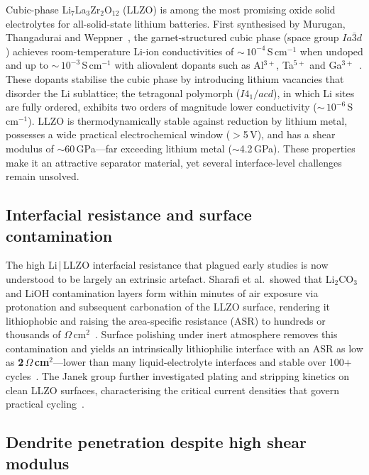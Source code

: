 \documentclass[12pt,a4paper,oneside]{book}
\begin{document}
Cubic-phase Li$_7$La$_3$Zr$_2$O$_{12}$ (LLZO) is among the most promising oxide solid electrolytes for all-solid-state lithium batteries. First synthesised by Murugan, Thangadurai and Weppner~\cite{Murugan2007}, the garnet-structured cubic phase (space group $Ia\bar{3}d$) achieves room-temperature Li-ion conductivities of $\sim$\,$10^{-4}$\,S\,cm$^{-1}$ when undoped and up to $\sim$\,$10^{-3}$\,S\,cm$^{-1}$ with aliovalent dopants such as Al$^{3+}$, Ta$^{5+}$ and Ga$^{3+}$~\cite{Thangadurai2014}. These dopants stabilise the cubic phase by introducing lithium vacancies that disorder the Li sublattice; the tetragonal polymorph ($I4_1/acd$), in which Li sites are fully ordered, exhibits two orders of magnitude lower conductivity ($\sim$\,$10^{-6}$\,S\,cm$^{-1}$). LLZO is thermodynamically stable against reduction by lithium metal, possesses a wide practical electrochemical window ($>$5\,V), and has a shear modulus of $\sim$60\,GPa---far exceeding lithium metal ($\sim$4.2\,GPa). These properties make it an attractive separator material, yet several interface-level challenges remain unsolved.

\subsection{Interfacial resistance and surface contamination}

The high Li\,|\,LLZO interfacial resistance that plagued early studies is now understood to be largely an extrinsic artefact. Sharafi et al.\ showed that Li$_2$CO$_3$ and LiOH contamination layers form within minutes of air exposure via protonation and subsequent carbonation of the LLZO surface, rendering it lithiophobic and raising the area-specific resistance (ASR) to hundreds or thousands of $\Omega$\,cm$^2$~\cite{Sharafi2017}. Surface polishing under inert atmosphere removes this contamination and yields an intrinsically lithiophilic interface with an ASR as low as \textbf{2\,$\Omega$\,cm$^2$}---lower than many liquid-electrolyte interfaces and stable over 100$+$ cycles~\cite{Sharafi2017chem}. The Janek group further investigated plating and stripping kinetics on clean LLZO surfaces, characterising the critical current densities that govern practical cycling~\cite{Krauskopf2019}.

\subsection{Dendrite penetration despite high shear modulus}
\end{document}
